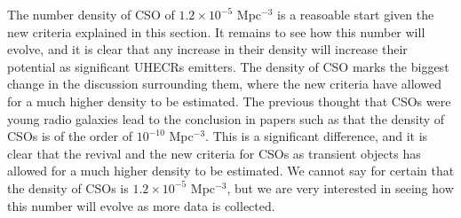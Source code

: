 The number density of CSO of $1.2 \times 10^{-5}$ Mpc$^{-3}$ is a reasoable start given the new criteria explained in this section. It remains to see how this number will evolve, and it is clear that any increase in their density will increase their potential as significant UHECRs emitters. The density of CSO marks the biggest change in the discussion surrounding them, where the new criteria have allowed for a much higher density to be estimated. The previous thought that CSOs were young radio galaxies lead to the conclusion in papers such as \cite{TAKAMI2011749} that the density of CSOs is of the order of $10^{-10}$ Mpc$^{-3}$. This is a significant difference, and it is clear that the revival and the new criteria for CSOs as transient objects has allowed for a much higher density to be estimated. We cannot say for certain that the density of CSOs is $1.2 \times 10^{-5}$ Mpc$^{-3}$, but we are very interested in seeing how this number will evolve as more data is collected.








